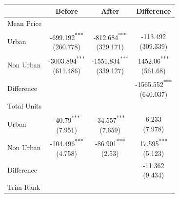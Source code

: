 \begin{tabular}{l|ccc}
\toprule
 & Before & After & Difference \\
\midrule
Mean Price \\
\midrule
Urban & \makecell{-699.192\textsuperscript{***} \\ (260.778)\\[0.25em]} & \makecell{-812.684\textsuperscript{***} \\ (329.171)\\[0.25em]} & \makecell{-113.492 \\ (309.339)\\[0.25em]} \\
Non Urban & \makecell{-3003.894\textsuperscript{***} \\ (611.486)\\[0.25em]} & \makecell{-1551.834\textsuperscript{***} \\ (339.127)\\[0.25em]} & \makecell{1452.06\textsuperscript{***} \\ (561.68)\\[0.25em]} \\
Difference &  &  & \makecell{-1565.552\textsuperscript{***} \\ (640.037)\\[0.25em]} \\
\midrule
Total Units \\
\midrule
Urban & \makecell{-40.79\textsuperscript{***} \\ (7.951)\\[0.25em]} & \makecell{-34.557\textsuperscript{***} \\ (7.659)\\[0.25em]} & \makecell{6.233 \\ (7.978)\\[0.25em]} \\
Non Urban & \makecell{-104.496\textsuperscript{***} \\ (4.758)\\[0.25em]} & \makecell{-86.901\textsuperscript{***} \\ (2.53)\\[0.25em]} & \makecell{17.595\textsuperscript{***} \\ (5.123)\\[0.25em]} \\
Difference &  &  & \makecell{-11.362 \\ (9.434)\\[0.25em]} \\
\midrule
Trim Rank \\

\end{tabular}
